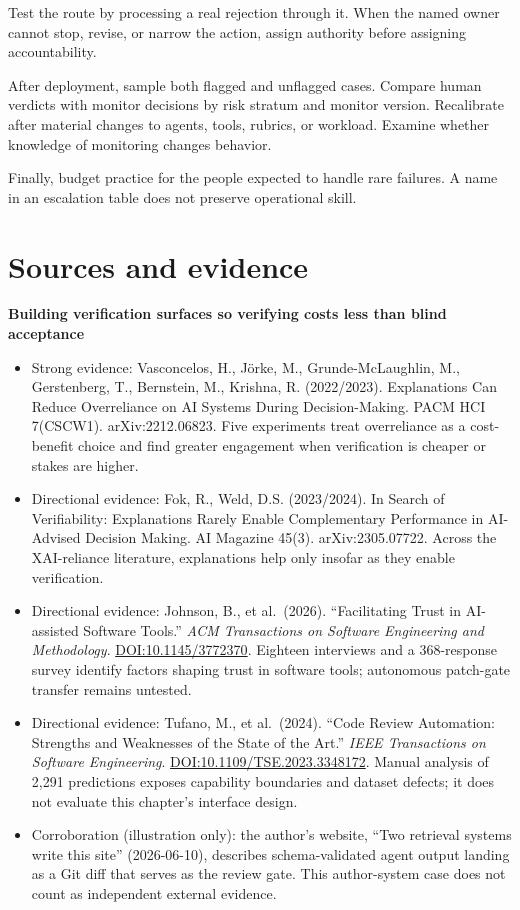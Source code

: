 Test the route by processing a real rejection through it. When the named owner cannot stop, revise, or narrow the action, assign authority before assigning accountability.

After deployment, sample both flagged and unflagged cases. Compare human verdicts with monitor decisions by risk stratum and monitor version. Recalibrate after material changes to agents, tools, rubrics, or workload. Examine whether knowledge of monitoring changes behavior.

Finally, budget practice for the people expected to handle rare failures. A name in an escalation table does not preserve operational skill.

\section*{Sources and evidence}

\textbf{Building verification surfaces so verifying costs less than blind acceptance}

\begin{itemize}
\tightlist
\item
  Strong evidence: Vasconcelos, H., Jörke, M., Grunde-McLaughlin, M., Gerstenberg, T., Bernstein, M., Krishna, R. (2022/2023). Explanations Can Reduce Overreliance on AI Systems During Decision-Making. PACM HCI 7(CSCW1). arXiv:2212.06823. Five experiments treat overreliance as a cost-benefit choice and find greater engagement when verification is cheaper or stakes are higher.
\item
  Directional evidence: Fok, R., Weld, D.S. (2023/2024). In Search of Verifiability: Explanations Rarely Enable Complementary Performance in AI-Advised Decision Making. AI Magazine 45(3). arXiv:2305.07722. Across the XAI-reliance literature, explanations help only insofar as they enable verification.
\item
  Directional evidence: Johnson, B., et al.~(2026). ``Facilitating Trust in AI-assisted Software Tools.'' \emph{ACM Transactions on Software Engineering and Methodology}. \href{https://doi.org/10.1145/3772370}{DOI:10.1145/3772370}. Eighteen interviews and a 368-response survey identify factors shaping trust in software tools; autonomous patch-gate transfer remains untested.
\item
  Directional evidence: Tufano, M., et al.~(2024). ``Code Review Automation: Strengths and Weaknesses of the State of the Art.'' \emph{IEEE Transactions on Software Engineering}. \href{https://doi.org/10.1109/TSE.2023.3348172}{DOI:10.1109/TSE.2023.3348172}. Manual analysis of 2,291 predictions exposes capability boundaries and dataset defects; it does not evaluate this chapter's interface design.
\item
  Corroboration (illustration only): the author's website, ``Two retrieval systems write this site'' (2026-06-10), describes schema-validated agent output landing as a Git diff that serves as the review gate. This author-system case does not count as independent external evidence.
\end{itemize}

